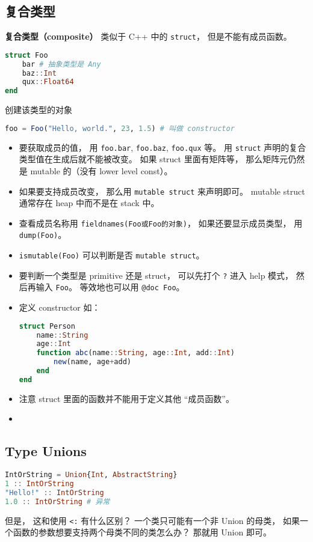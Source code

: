 \subsection{复合类型}
\textbf{复合类型（composite）} 类似于 C++ 中的 \verb|struct|， 但是不能有成员函数。
\begin{lstlisting}[language=julia]
struct Foo
    bar # 抽象类型是 Any
    baz::Int
    qux::Float64
end
\end{lstlisting}
创建该类型的对象
\begin{lstlisting}[language=julia]
foo = Foo("Hello, world.", 23, 1.5) # 叫做 constructor
\end{lstlisting}
\begin{itemize}
\item 要获取成员的值， 用 \verb|foo.bar|, \verb|foo.baz|, \verb|foo.qux| 等。 用 \verb|struct| 声明的复合类型值在生成后就不能被改变。 如果 struct 里面有矩阵等， 那么矩阵元仍然是 mutable 的（没有 lower level const）。
\item 如果要支持成员改变， 那么用 \verb|mutable struct| 来声明即可。 mutable struct 通常存在 heap 中而不是在 stack 中。
\item 查看成员名称用 \verb|fieldnames(Foo或Foo的对象)|， 如果还要显示成员类型， 用 \verb|dump(Foo)|。
\item \verb|ismutable(Foo)| 可以判断是否 \verb|mutable struct|。
\item 要判断一个类型是 primitive 还是 struct， 可以先打个 \verb|?| 进入 help 模式， 然后再输入 \verb|Foo|。 等效地也可以用 \verb|@doc Foo|。
\item 定义 constructor 如：
\begin{lstlisting}[language=julia]
struct Person
    name::String
    age::Int
    function abc(name::String, age::Int, add::Int)
        new(name, age+add)
    end
end
\end{lstlisting}
\item 注意 struct 里面的函数并不能用于定义其他 “成员函数”。
\end{itemize}

\begin{itemize}
\item 
\end{itemize}


\subsection{Type Unions}
\begin{lstlisting}[language=julia]
IntOrString = Union{Int, AbstractString}
1 :: IntOrString
"Hello!" :: IntOrString
1.0 :: IntOrString # 异常
\end{lstlisting}
但是， 这和使用 \verb|<:| 有什么区别？ 一个类只可能有一个非 Union 的母类， 如果一个函数的参数想要支持两个母类不同的类怎么办？ 那就用 Union 即可。

